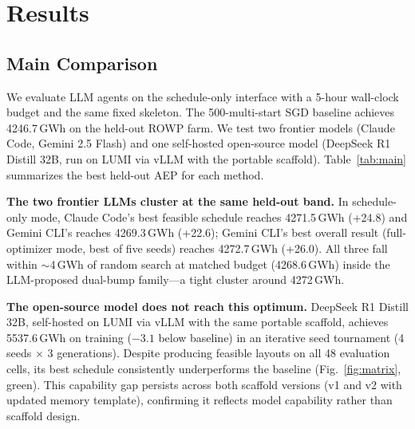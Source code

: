 \section{Results}
\label{sec:results}

\subsection{Main Comparison}
\label{sec:main_comparison}

We evaluate LLM agents on the schedule-only interface with a
5-hour wall-clock budget and the same fixed skeleton. The 500-multi-start
SGD baseline achieves 4246.7\,GWh on the
held-out ROWP farm. We test two frontier models (Claude Code, Gemini
2.5 Flash) and one self-hosted open-source model (DeepSeek R1
Distill 32B, run on LUMI via vLLM with the portable scaffold).
Table~\ref{tab:main} summarizes the best held-out AEP for each method.


\textbf{The two frontier LLMs cluster at the same held-out band.}
In schedule-only mode, Claude Code's best feasible schedule reaches
4271.5\,GWh (+24.8) and Gemini CLI's reaches 4269.3\,GWh (+22.6);
Gemini CLI's best overall result (full-optimizer mode, best of five
seeds) reaches 4272.7\,GWh (+26.0). All three fall within $\sim$4\,GWh
of random search at matched budget (4268.6\,GWh) inside the LLM-proposed
dual-bump family---a tight cluster around 4272\,GWh.

\textbf{The open-source model does not reach this optimum.}
DeepSeek R1 Distill 32B, self-hosted on LUMI via vLLM with the
same portable scaffold, achieves 5537.6\,GWh on training ($-3.1$
below baseline) in an iterative seed tournament (4 seeds $\times$
3 generations). Despite producing feasible layouts on all 48
evaluation cells, its best schedule consistently underperforms the
baseline (Fig.~\ref{fig:matrix}, green). This capability gap
persists across both scaffold versions (v1 and v2 with updated
memory template), confirming it reflects model capability rather
than scaffold design.

